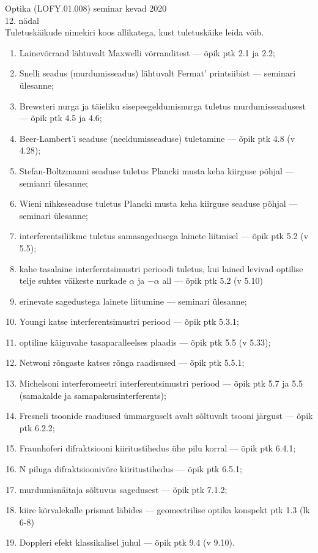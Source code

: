 \documentclass[11pt]{article}
\begin{document}
{\small Optika (LOFY.01.008) seminar \hfill kevad 2020}\\

{\Large 12. nädal}\\

Tuletuskäikude nimekiri koos allikatega, kust tuletuskäike leida võib. \\

\begin{enumerate}
  \item Lainevõrrand lähtuvalt Maxwelli võrranditest --- õpik ptk 2.1 ja 2.2;
  \item Snelli seadus (murdumisseadus) lähtuvalt Fermat' printsiibist --- seminari ülesanne;
  \item Brewsteri nurga ja täieliku sisepeegeldumisnurga tuletus murdumisseadusest --- õpik ptk 4.5 ja 4.6;
  \item Beer-Lambert'i seaduse (neeldumisseaduse) tuletamine --- õpik ptk 4.8 (v 4.28);
  \item Stefan-Boltzmanni seaduse tuletus Plancki musta keha kiirguse põhjal --- semianri ülesanne;
  \item Wieni nihkeseaduse tuletus Plancki musta keha kiirguse seaduse põhjal --- seminari ülesanne;
  \item interferentsiliikme tuletus samasagedusega lainete liitmisel --- õpik ptk 5.2 (v 5.5);
  \item kahe tasalaine interferntsimustri perioodi tuletus, kui lained levivad optilise telje suhtes väikeste nurkade \(\alpha\) ja \(-\alpha\) all --- õpik ptk 5.2 (v 5.10)
  \item erinevate sagedustega lainete liitumine --- seminari ülesanne;
  \item Youngi katse interferentsimustri periood --- õpik ptk 5.3.1;
  \item optiline käiguvahe tasaparalleelses plaadis --- õpik ptk 5.5 (v 5.33);
  \item Netwoni rõngaste katses rõnga raadisused --- õpik ptk 5.5.1;
  \item Michelsoni interferomeetri interferentsimustri periood --- õpik ptk 5.7 ja 5.5 (samakalde  ja samapaksusinterferents);
  \item Fresneli tsoonide raadiused ümmarguselt avalt sõltuvalt tsooni järgust --- õpik ptk 6.2.2;
  \item Fraunhoferi difraktsiooni kiiritustihedus ühe pilu korral --- õpik ptk 6.4.1;
  \item N piluga difraktsioonivõre kiiritustihedus --- õpik ptk 6.5.1;
  \item murdumisnäitaja sõltuvus sagedusest --- õpik ptk 7.1.2;
  \item kiire kõrvalekalle prismat läbides --- geomeetrilise optika konspekt ptk 1.3 (lk 6-8)
  \item Doppleri efekt klassikalisel juhul --- õpik ptk 9.4 (v 9.10).

\end{enumerate}
\end{document}
